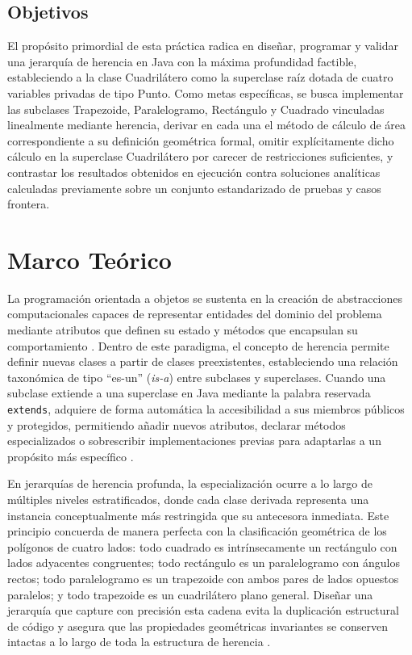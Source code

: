 \documentclass[letterpaper,12pt,oneside]{article}
\numberwithin{figure}{section}
\begin{document}
\subsection{Objetivos}
El prop\'osito primordial de esta pr\'actica radica en dise\~nar, programar y validar una jerarqu\'ia de herencia en Java con la m\'axima profundidad factible, estableciendo a la clase Cuadril\'atero como la superclase ra\'iz dotada de cuatro variables privadas de tipo Punto. Como metas espec\'ificas, se busca implementar las subclases Trapezoide, Paralelogramo, Rect\'angulo y Cuadrado vinculadas linealmente mediante herencia, derivar en cada una el m\'etodo de c\'alculo de \'area correspondiente a su definici\'on geom\'etrica formal, omitir expl\'icitamente dicho c\'alculo en la superclase Cuadril\'atero por carecer de restricciones suficientes, y contrastar los resultados obtenidos en ejecuci\'on contra soluciones anal\'iticas calculadas previamente sobre un conjunto estandarizado de pruebas y casos frontera.

\clearpage

\section{Marco Te\'orico}

La programaci\'on orientada a objetos se sustenta en la creaci\'on de abstracciones computacionales capaces de representar entidades del dominio del problema mediante atributos que definen su estado y m\'etodos que encapsulan su comportamiento \cite{deitel2018}. Dentro de este paradigma, el concepto de herencia permite definir nuevas clases a partir de clases preexistentes, estableciendo una relaci\'on taxon\'omica de tipo ``es-un'' (\textit{is-a}) entre subclases y superclases. Cuando una subclase extiende a una superclase en Java mediante la palabra reservada \texttt{extends}, adquiere de forma autom\'atica la accesibilidad a sus miembros p\'ublicos y protegidos, permitiendo a\~nadir nuevos atributos, declarar m\'etodos especializados o sobrescribir implementaciones previas para adaptarlas a un prop\'osito m\'as espec\'ifico \cite{gosling2023}.

En jerarqu\'ias de herencia profunda, la especializaci\'on ocurre a lo largo de m\'ultiples niveles estratificados, donde cada clase derivada representa una instancia conceptualmente m\'as restringida que su antecesora inmediata. Este principio concuerda de manera perfecta con la clasificaci\'on geom\'etrica de los pol\'igonos de cuatro lados: todo cuadrado es intr\'insecamente un rect\'angulo con lados adyacentes congruentes; todo rect\'angulo es un paralelogramo con \'angulos rectos; todo paralelogramo es un trapezoide con ambos pares de lados opuestos paralelos; y todo trapezoide es un cuadril\'atero plano general. Dise\~nar una jerarqu\'ia que capture con precisi\'on esta cadena evita la duplicaci\'on estructural de c\'odigo y asegura que las propiedades geom\'etricas invariantes se conserven intactas a lo largo de toda la estructura de herencia \cite{bloch2018}.
\end{document}
